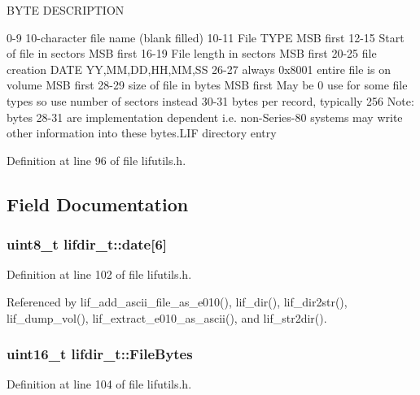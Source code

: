 B\+Y\+TE D\+E\+S\+C\+R\+I\+P\+T\+I\+ON 

 0-\/9 10-\/character file name (blank filled) 10-\/11 File T\+Y\+PE M\+SB first 12-\/15 Start of file in sectors M\+SB first 16-\/19 File length in sectors M\+SB first 20-\/25 file creation D\+A\+TE YY,MM,DD,HH,MM,SS 26-\/27 always 0x8001 entire file is on volume M\+SB first 28-\/29 size of file in bytes M\+SB first May be 0 use for some file types so use number of sectors instead 30-\/31 bytes per record, typically 256 Note\+: bytes 28-\/31 are implementation dependent i.\+e. non-\/\+Series-\/80 systems may write other information into these bytes.\+L\+IF directory entry 

Definition at line 96 of file lifutils.\+h.



\subsection{Field Documentation}
\subsubsection[{\texorpdfstring{date}{date}}]{\setlength{\rightskip}{0pt plus 5cm}uint8\+\_\+t lifdir\+\_\+t\+::date\mbox{[}6\mbox{]}}\hypertarget{structlifdir__t_afb6d03670642d3bf86f460ae246ceb0b}{}\label{structlifdir__t_afb6d03670642d3bf86f460ae246ceb0b}


Definition at line 102 of file lifutils.\+h.



Referenced by lif\+\_\+add\+\_\+ascii\+\_\+file\+\_\+as\+\_\+e010(), lif\+\_\+dir(), lif\+\_\+dir2str(), lif\+\_\+dump\+\_\+vol(), lif\+\_\+extract\+\_\+e010\+\_\+as\+\_\+ascii(), and lif\+\_\+str2dir().

\subsubsection[{\texorpdfstring{File\+Bytes}{FileBytes}}]{\setlength{\rightskip}{0pt plus 5cm}uint16\+\_\+t lifdir\+\_\+t\+::\+File\+Bytes}\hypertarget{structlifdir__t_a6e2414bf7966358862b59c5eaf3903f2}{}\label{structlifdir__t_a6e2414bf7966358862b59c5eaf3903f2}


Definition at line 104 of file lifutils.\+h.



